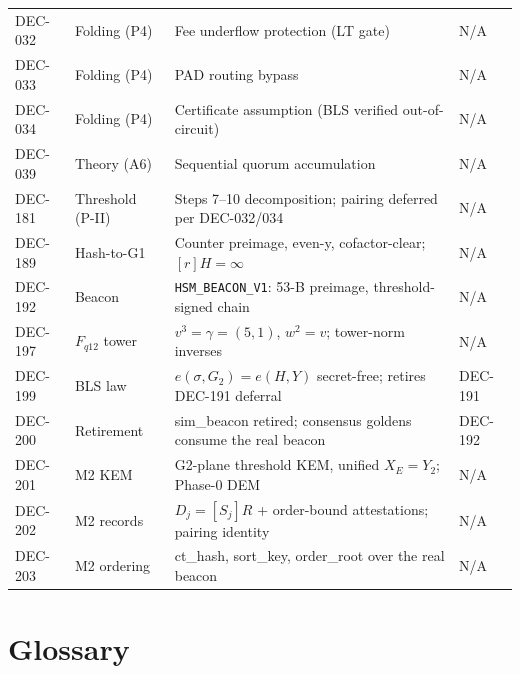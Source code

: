 \documentclass[11pt, a4paper]{article}
\begin{document}
\begin{center}
\begin{longtable}{l|l|l|l}
DEC-032 & Folding (P4) & Fee underflow protection (LT gate) & N/A \\
DEC-033 & Folding (P4) & PAD routing bypass & N/A \\
DEC-034 & Folding (P4) & Certificate assumption (BLS verified out-of-circuit) & N/A \\
DEC-039 & Theory (A6) & Sequential quorum accumulation & N/A \\
DEC-181 & Threshold (P-II) & Steps 7--10 decomposition; pairing deferred per DEC-032/034 & N/A \\
DEC-189 & Hash-to-G1 & Counter preimage, even-y, cofactor-clear; $[r]H=\infty$ & N/A \\
DEC-192 & Beacon & \texttt{HSM\_BEACON\_V1}: 53-B preimage, threshold-signed chain & N/A \\
DEC-197 & $F_{q12}$ tower & $v^3=\gamma=(5,1)$, $w^2=v$; tower-norm inverses & N/A \\
DEC-199 & BLS law & $e(\sigma,G_2)=e(H,Y)$ secret-free; retires DEC-191 deferral & DEC-191 \\
DEC-200 & Retirement & sim\_beacon retired; consensus goldens consume the real beacon & DEC-192 \\
DEC-201 & M2 KEM & G2-plane threshold KEM, unified $X_E=Y_2$; Phase-0 DEM & N/A \\
DEC-202 & M2 records & $D_j=[S_j]R$ + order-bound attestations; pairing identity & N/A \\
DEC-203 & M2 ordering & ct\_hash, sort\_key, order\_root over the real beacon & N/A \\
\end{longtable}
\end{center}

\section{Glossary}
\end{document}
